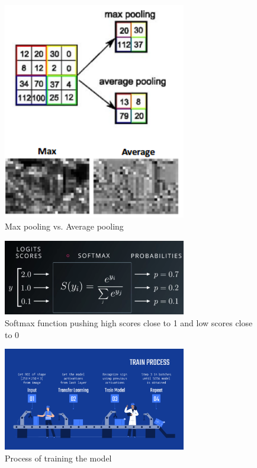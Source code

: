 \documentclass[twocolumn]{article}
\begin{document}
\begin{figure}[h]
\centering
\includegraphics[width=8cm]{./figures/max pooling vs. average pooling}
\caption{Max pooling vs. Average pooling}
\end{figure}

\begin{figure}[h]
\centering
\includegraphics[width=8cm]{./figures/softmax function}
\caption{Softmax function pushing high scores close to 1 and low scores close to 0}
\end{figure}

\begin{figure}[h]
\centering
\includegraphics[width=8cm]{./figures/train process}
\caption{Process of training the model}
\end{figure}
\end{document}
